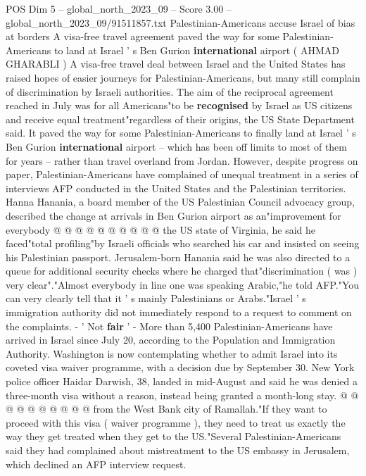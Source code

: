 \begin{textsample}{POS Dim 5 – global\_north\_2023\_09 – Score 3.00 – global\_north\_2023\_09/91511857.txt}  \label{ex:f5_pos_434}
Palestinian-Americans accuse Israel of bias at borders A visa-free travel agreement paved the way for some Palestinian-Americans to land at Israel ' s Ben Gurion \textbf{international} airport ( AHMAD GHARABLI ) A visa-free travel deal between Israel and the United States has raised hopes of easier journeys for Palestinian-Americans, but many still complain of discrimination by Israeli authorities.
The aim of the reciprocal agreement reached in July was for all Americans"to be \textbf{recognised} by Israel as US citizens and receive equal treatment"regardless of their origins, the US State Department said.
It paved the way for some Palestinian-Americans to finally land at Israel ' s Ben Gurion \textbf{international} airport -- which has been off limits to most of them for years -- rather than travel overland from Jordan.
However, despite progress on paper, Palestinian-Americans have complained of unequal treatment in a series of interviews AFP conducted in the United States and the Palestinian territories.
Hanna Hanania, a board member of the US Palestinian Council advocacy group, described the change at arrivals in Ben Gurion airport as an"improvement for everybody @ @ @ @ @ @ @ @ @ @ the US state of Virginia, he said he faced"total profiling"by Israeli officials who searched his car and insisted on seeing his Palestinian passport.
Jerusalem-born Hanania said he was also directed to a queue for additional security checks where he charged that"discrimination ( was ) very clear"."Almost everybody in line one was speaking Arabic,"he told AFP."You can very clearly tell that it ' s mainly Palestinians or Arabs."Israel ' s immigration authority did not immediately respond to a request to comment on the complaints. - ' Not \textbf{fair} ' - More than 5,400 Palestinian-Americans have arrived in Israel since July 20, according to the Population and Immigration Authority.
Washington is now contemplating whether to admit Israel into its coveted visa waiver programme, with a decision due by September 30.
New York police officer Haidar Darwish, 38, landed in mid-August and said he was denied a three-month visa without a reason, instead being granted a month-long stay. @ @ @ @ @ @ @ @ @ @ from the West Bank city of Ramallah."If they want to proceed with this visa ( waiver programme ), they need to treat us exactly the way they get treated when they get to the US."Several Palestinian-Americans said they had complained about mistreatment to the US embassy in Jerusalem, which declined an AFP interview request.

\end{textsample}
